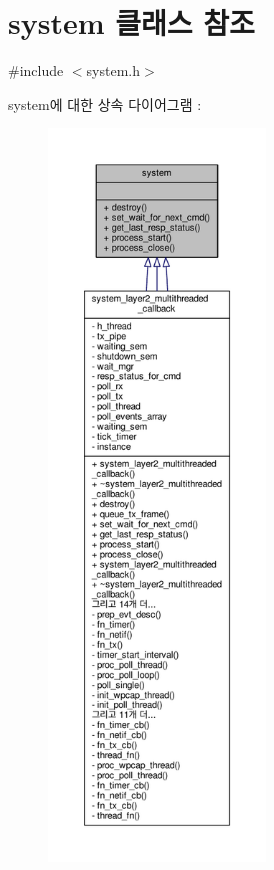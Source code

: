 \hypertarget{classavdecc__lib_1_1system}{}\section{system 클래스 참조}
\label{classavdecc__lib_1_1system}


{\ttfamily \#include $<$system.\+h$>$}



system에 대한 상속 다이어그램 \+: 
\nopagebreak
\begin{figure}[H]
\begin{center}
\leavevmode
\includegraphics[height=550pt]{classavdecc__lib_1_1system__inherit__graph}
\end{center}
\end{figure}


